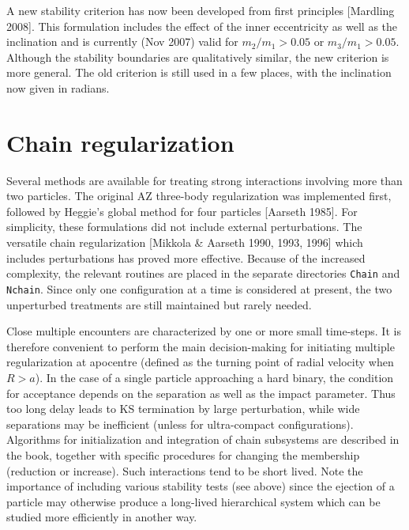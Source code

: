 \documentclass[12pt]{article}
\begin{document}
A new stability criterion has now been developed from first principles
[Mardling 2008].
This formulation includes the effect of the inner eccentricity as well as the
inclination and is currently (Nov 2007) valid for
$m_2/m_1 > 0.05$ or $m_3/m_1 > 0.05$.
Although the stability boundaries are qualitatively similar, the new
criterion is more general.
The old criterion is still used in a few places, with the inclination now
given in radians.

\section{Chain regularization}

Several methods are available for treating strong interactions involving more
than two particles.
The original AZ three-body regularization was implemented first, followed by
Heggie's global method for four particles [\cf Aarseth 1985].
For simplicity, these formulations did not include external perturbations.
The versatile chain regularization [Mikkola \& Aarseth 1990, 1993, 1996]
which includes perturbations has proved more effective.
Because of the increased complexity, the relevant routines are placed in the
separate directories {\tt Chain} and {\tt Nchain}.
Since only one configuration at a time is considered at present, the two
unperturbed treatments are still maintained but rarely needed.

Close multiple encounters are characterized by one or more small \cm
time-steps.
It is therefore convenient to perform the main decision-making for initiating
multiple regularization at apocentre (defined as the turning point of radial
velocity when $R > a$).
In the case of a single particle approaching a hard binary, the condition
for acceptance depends on the separation as well as the impact parameter.
Thus too long delay leads to KS termination by large perturbation, while
wide separations may be inefficient (unless for ultra-compact
configurations).
Algorithms for initialization and integration of chain subsystems are
described in the book, together with specific procedures for changing the
membership (reduction or increase).
Such interactions tend to be short lived.
Note the importance of including various stability tests (see above) since
the ejection of a particle may otherwise produce a long-lived hierarchical
system which can be studied more efficiently in another way.
\end{document}
